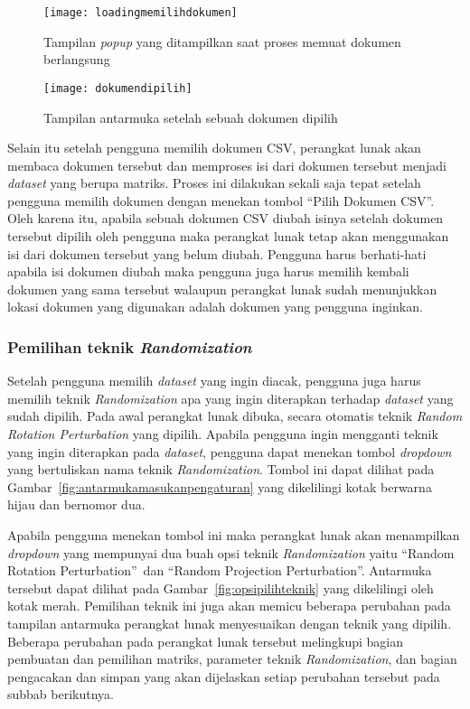 \begin{figure}
	\centering
	\texttt{[image: loadingmemilihdokumen]}
	\caption{Tampilan \textit{popup} yang ditampilkan saat proses memuat dokumen berlangsung}
	\label{fig:loadingmemilihdokumen}
\end{figure}

\begin{figure}
	\centering
	\texttt{[image: dokumendipilih]}
	\caption{Tampilan antarmuka setelah sebuah dokumen dipilih}
	\label{fig:dokumendipilih}
\end{figure}

Selain itu setelah pengguna memilih dokumen CSV, perangkat lunak akan membaca dokumen tersebut dan memproses isi dari dokumen tersebut menjadi \textit{dataset} yang berupa matriks. Proses ini dilakukan sekali saja tepat setelah pengguna memilih dokumen dengan menekan tombol \textquotedblleft Pilih Dokumen CSV\textquotedblright. Oleh karena itu, apabila sebuah dokumen CSV diubah isinya setelah dokumen tersebut dipilih oleh pengguna maka perangkat lunak tetap akan menggunakan isi dari dokumen tersebut yang belum diubah. Pengguna harus berhati-hati apabila isi dokumen diubah maka pengguna juga harus memilih kembali dokumen yang sama tersebut walaupun perangkat lunak sudah menunjukkan lokasi dokumen yang digunakan adalah dokumen yang pengguna inginkan.

\subsubsection{Pemilihan teknik \textit{Randomization}}
\label{subsubsec:pilihteknik}

Setelah pengguna memilih \textit{dataset} yang ingin diacak, pengguna juga harus memilih teknik \textit{Randomization} apa yang ingin diterapkan terhadap \textit{dataset} yang sudah dipilih. Pada awal perangkat lunak dibuka, secara otomatis teknik \textit{Random Rotation Perturbation} yang dipilih. Apabila pengguna ingin mengganti teknik yang ingin diterapkan pada \textit{dataset}, pengguna dapat menekan tombol \textit{dropdown} yang bertuliskan nama teknik \textit{Randomization}. Tombol ini dapat dilihat pada Gambar~\ref{fig:antarmukamasukanpengaturan} yang dikelilingi kotak berwarna hijau dan bernomor dua.

Apabila pengguna menekan tombol ini maka perangkat lunak akan menampilkan \textit{dropdown} yang mempunyai dua buah opsi teknik \textit{Randomization} yaitu \textquotedblleft Random Rotation Perturbation\textquotedblright~dan \textquotedblleft Random Projection Perturbation\textquotedblright. Antarmuka tersebut dapat dilihat pada Gambar~\ref{fig:opsipilihteknik} yang dikelilingi oleh kotak merah. Pemilihan teknik ini juga akan memicu beberapa perubahan pada tampilan antarmuka perangkat lunak menyesuaikan dengan teknik yang dipilih. Beberapa perubahan pada perangkat lunak tersebut melingkupi bagian pembuatan dan pemilihan matriks, parameter teknik \textit{Randomization}, dan bagian pengacakan dan simpan yang akan dijelaskan setiap perubahan tersebut pada subbab berikutnya.

